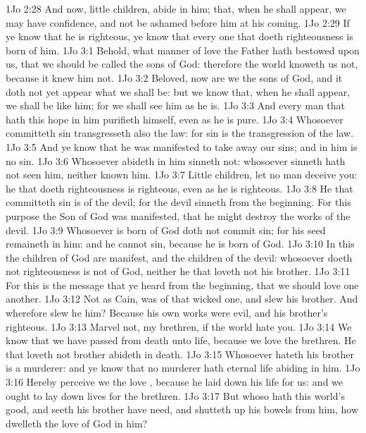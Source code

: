 \vs 1Jo 2:28 And now, little children, abide in him; that, when he shall appear, we may have confidence, and not be ashamed before him at his coming.
\vs 1Jo 2:29 If ye know that he is righteous, ye know that every one that doeth righteousness is born of him.
\vs 1Jo 3:1 Behold, what manner of love the Father hath bestowed upon us, that we should be called the sons of God: therefore the world knoweth us not, because it knew him not.
\vs 1Jo 3:2 Beloved, now are we the sons of God, and it doth not yet appear what we shall be: but we know that, when he shall appear, we shall be like him; for we shall see him as he is.
\vs 1Jo 3:3 And every man that hath this hope in him purifieth himself, even as he is pure.
\vs 1Jo 3:4 Whosoever committeth sin transgresseth also the law: for sin is the transgression of the law.
\vs 1Jo 3:5 And ye know that he was manifested to take away our sins; and in him is no sin.
\vs 1Jo 3:6 Whosoever abideth in him sinneth not: whosoever sinneth hath not seen him, neither known him.
\vs 1Jo 3:7 Little children, let no man deceive you: he that doeth righteousness is righteous, even as he is righteous.
\vs 1Jo 3:8 He that committeth sin is of the devil; for the devil sinneth from the beginning. For this purpose the Son of God was manifested, that he might destroy the works of the devil.
\vs 1Jo 3:9 Whosoever is born of God doth not commit sin; for his seed remaineth in him: and he cannot sin, because he is born of God.
\vs 1Jo 3:10 In this the children of God are manifest, and the children of the devil: whosoever doeth not righteousness is not of God, neither he that loveth not his brother.
\vs 1Jo 3:11 For this is the message that ye heard from the beginning, that we should love one another.
\vs 1Jo 3:12 Not as Cain,  was of that wicked one, and slew his brother. And wherefore slew he him? Because his own works were evil, and his brother's righteous.
\vs 1Jo 3:13 Marvel not, my brethren, if the world hate you.
\vs 1Jo 3:14 We know that we have passed from death unto life, because we love the brethren. He that loveth not  brother abideth in death.
\vs 1Jo 3:15 Whosoever hateth his brother is a murderer: and ye know that no murderer hath eternal life abiding in him.
\vs 1Jo 3:16 Hereby perceive we the love , because he laid down his life for us: and we ought to lay down  lives for the brethren.
\vs 1Jo 3:17 But whoso hath this world's good, and seeth his brother have need, and shutteth up his bowels  from him, how dwelleth the love of God in him?
